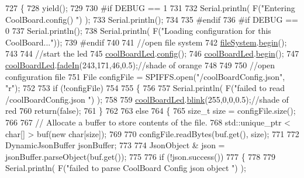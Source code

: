 \begin{DoxyCode}
727 \{
728     yield();
729 
730 \textcolor{preprocessor}{#if DEBUG == 1}
731 
732     Serial.println( F(\textcolor{stringliteral}{"Entering CoolBoard.config() "}) );
733     Serial.println();
734 
735 \textcolor{preprocessor}{#endif}
736 \textcolor{preprocessor}{#if DEBUG == 0}
737     Serial.println();
738     Serial.println( F(\textcolor{stringliteral}{"Loading configuration for this CoolBoard..."}));
739 \textcolor{preprocessor}{#endif }
740 
741     \textcolor{comment}{//open file system}
742     \hyperlink{class_cool_board_a42c2586fbb13ff7f06538e9284e8538d}{fileSystem}.\hyperlink{class_cool_file_system_a6ba6f666ed4c530174f8569d2c636748}{begin}();
743     
744     \textcolor{comment}{//start the led}
745     \hyperlink{class_cool_board_a1b1d3c684a5baa56b08486e192fd8e97}{coolBoardLed}.\hyperlink{class_cool_board_led_a1b60e5e30bea96c49ed62ed1bf1ffc8b}{config}();
746     \hyperlink{class_cool_board_a1b1d3c684a5baa56b08486e192fd8e97}{coolBoardLed}.\hyperlink{class_cool_board_led_ae3cbde8affcc6f011cbd698c8ef911f6}{begin}();
747     \hyperlink{class_cool_board_a1b1d3c684a5baa56b08486e192fd8e97}{coolBoardLed}.\hyperlink{class_cool_board_led_ab778f5e7bed0ab74e3906d82110493c3}{fadeIn}(243,171,46,0.5);\textcolor{comment}{//shade of orange     }
748 
749     
750     \textcolor{comment}{//open configuration file}
751     File configFile = SPIFFS.open(\textcolor{stringliteral}{"/coolBoardConfig.json"}, \textcolor{stringliteral}{"r"});
752     
753     \textcolor{keywordflow}{if} (!configFile)
754 
755     \{
756     
757         Serial.println( F(\textcolor{stringliteral}{"failed to read /coolBoardConfig.json  "}) );
758 
759         \hyperlink{class_cool_board_a1b1d3c684a5baa56b08486e192fd8e97}{coolBoardLed}.\hyperlink{class_cool_board_led_a96e1ea13003eee34c9dbcef340404426}{blink}(255,0,0,0.5);\textcolor{comment}{//shade of red     }
760         \textcolor{keywordflow}{return}(\textcolor{keyword}{false});
761     \}
762 
763     \textcolor{keywordflow}{else}
764     \{
765         \textcolor{keywordtype}{size\_t} size = configFile.size();
766 
767         \textcolor{comment}{// Allocate a buffer to store contents of the file.}
768         std::unique\_ptr < char[] > buf(\textcolor{keyword}{new} \textcolor{keywordtype}{char}[size]);
769 
770         configFile.readBytes(buf.get(), size);
771 
772         DynamicJsonBuffer jsonBuffer;
773 
774         JsonObject & json = jsonBuffer.parseObject(buf.get());
775 
776         \textcolor{keywordflow}{if} (!json.success())
777         \{
778         
779             Serial.println( F(\textcolor{stringliteral}{"failed to parse CoolBoard Config json object "}) );

\end{DoxyCode}

